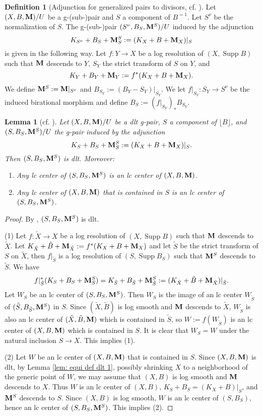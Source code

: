 \documentclass[11pt]{amsart}
\numberwithin{equation}{section}
\newcommand{\Mm}{{\bf{M}}}
\newcommand{\Supp}{\operatorname{Supp}}
\newtheorem{lem}[thm]{Lemma}
\theoremstyle{definition}
\newtheorem{defn}[thm]{Definition}
\theoremstyle{definition}
\theoremstyle{definition}
\begin{document}
\begin{defn}[Adjunction for generalized pairs to divisors, cf. {\cite[Definition 4.7]{BZ16}}]\label{defn: adj to lc places}
Let $(X,B,\Mm)/U$ be a g-(sub-)pair and $S$ a component of $B^{=1}$. Let $S^\nu$ be the normalization of $S$. The g-(sub-)pair $(S^\nu,B_S,\Mm^S)/U$ induced by the adjunction
$$K_{S^\nu}+B_S+\Mm^S_S:=(K_X+B+\Mm_X)|_S$$
is given in the following way. Let $f: Y\rightarrow X$ be a log resolution of $(X,\Supp B)$ such that $\Mm$ descends to $Y$, $S_Y$ the strict transform of $S$ on $Y$, and 
$$K_Y+B_Y+\Mm_Y:=f^*(K_X+B+\Mm_X).$$ 
We define $\Mm^S:=\Mm|_{S^\nu}$ and $B_{S_Y}:=(B_Y-S_Y)|_{S_Y}$. We let $f|_{S_Y}: S_Y\rightarrow S^\nu$ be the induced birational morphism and define $B_S:=(f|_{S_Y})_*B_{S_Y}$.
\end{defn}



\begin{lem}[cf. {\cite[Lemma 3.18(2)]{LX23b}}]\label{lem: inversion of adjunction gdlt}
Let $(X,B,\Mm)/U$ be a dlt g-pair, $S$ a component of $\lfloor B\rfloor$, and $(S,B_S,\Mm^S)/U$ the g-pair induced by the adjunction 
$$K_S+B_S+\Mm^S_S:=(K_X+B+\Mm_X)|_S.$$
Then $(S,B_S,\Mm^S)$ is dlt. Moreover:
\begin{enumerate}
    \item Any lc center of $(S,B_S,\Mm^S)$ is an lc center of $(X,B,\Mm)$.
    \item Any lc center of $(X,B,\Mm)$ that is contained in $S$ is an lc center of $(S,B_S,\Mm^S)$.
\end{enumerate}
\end{lem}
\begin{proof}
By \cite[Lemma 2.9]{HL22}, $(S,B_S,\Mm^S)$ is dlt.

(1) Let $f: \tilde X\rightarrow X$ be a log resolution of $(X,\Supp B)$ such that $\Mm$ descends to $\tilde X$. Let $K_{\tilde X}+\tilde B+\Mm_{\tilde X}:=f^*(K_X+B+\Mm_X)$ and let $\tilde S$ be the strict transform of $S$ on $\tilde X$, then
$f|_{\tilde S}$ is a log resolution of $(S,\Supp B_S)$ such that $\Mm^S$ descends to $\tilde S$. We have
$$f|_{\tilde S}^*(K_S+B_S+\Mm^S_S)=K_{\tilde S}+B_{\tilde S}+\Mm^S_{\tilde S}:=(K_{\tilde X}+\tilde B+\Mm_{\tilde X})|_{\tilde S}.$$
Let $W_S$ be an lc center of $(S,B_S,\Mm^S)$. Then $W_S$ is the image of an lc center $W_{\tilde S}$ of $(\tilde S,B_{\tilde S},\Mm^S)$ in $S$. Since $(\tilde X,\tilde B)$ is log smooth and $\Mm$ descends to $\tilde X$, $W_{\tilde S}$ is also an lc center of $(\tilde X,\tilde B,\Mm)$ which is contained in $\tilde S$, so $W:=f(W_{\tilde S})$ is an lc center of $(X,B,\Mm)$ which is contained in $S$. It is clear that $W_S=W$ under the natural inclusion $S\rightarrow X$. This implies (1).

(2) Let $W$ be an lc center of $(X,B,\Mm)$ that is contained in $S$. Since $(X,B,\Mm)$ is dlt, by Lemma \ref{lem: equi def dlt 1}, possibly shrinking $X$ to a neighborhood of the generic point of $W$, we may assume that $(X,B)$ is log smooth and $\Mm$ descends to $X$. Thus $W$ is an lc center of $(X,B)$, $K_S+B_S=(K_X+B)|_S$, and $\Mm^S$ descends to $S$. Since $(X,B)$ is log smooth, $W$ is an lc center of $(S,B_S)$, hence an lc center of $(S,B_S,\Mm^S)$. This implies (2).
\end{proof}
\end{document}
